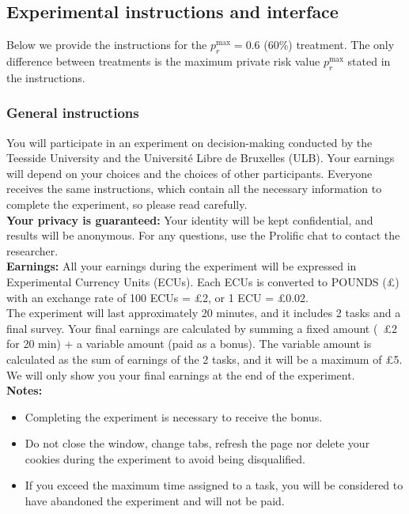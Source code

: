 \documentclass[pdflatex,sn-mathphys-ay]{sn-jnl}
\theoremstyle{thmstyleone}
\theoremstyle{thmstyletwo}
\theoremstyle{thmstylethree}
\begin{document}
\subsection{Experimental instructions and interface}
\label{si:sec:instructions}

Below we provide the instructions for the \(p_r^{\max}=0.6\) (60\%) treatment. The only difference between treatments is the maximum private risk value \(p_r^{\max}\) stated in the instructions.

\subsubsection{General instructions}
\label{si:sec:instructions-general}

You will participate in an experiment on decision-making conducted by the Teesside University and the Université Libre de Bruxelles (ULB). Your earnings will depend on your choices and the choices of other participants. Everyone receives the same instructions, which contain all the necessary information to complete the experiment, so please read carefully.\\

\noindent\textbf{Your privacy is guaranteed:} Your identity will be kept confidential, and results will be anonymous. For any questions, use the Prolific chat to contact the researcher.\\

\noindent\textbf{Earnings:} All your earnings during the experiment will be expressed in Experimental Currency Units (ECUs). Each ECUs is converted to POUNDS (£) with an exchange rate of 100 ECUs = £2, or 1 ECU = £0.02.\\

The experiment will last approximately 20 minutes, and it includes 2 tasks and a final survey. Your final earnings are calculated by summing a fixed amount (~£2 for 20 min) + a variable amount (paid as a bonus). The variable amount is calculated as the sum of earnings of the 2 tasks, and it will be a maximum of £5. We will only show you your final earnings at the end of the experiment.\\

\noindent\textbf{Notes:}

\begin{itemize}
    \item Completing the experiment is necessary to receive the bonus.
    \item Do not close the window, change tabs, refresh the page nor delete your cookies during the experiment to avoid being disqualified.
    \item If you exceed the maximum time assigned to a task, you will be considered to have abandoned the experiment and will not be paid.
\end{itemize}
\end{document}
